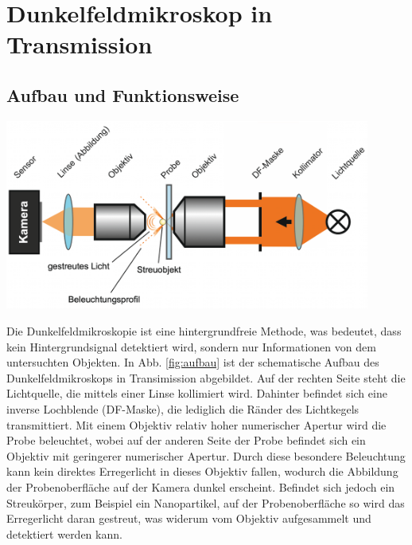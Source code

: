 
\section{Dunkelfeldmikroskop in Transmission}
\label{sec:mikroskop}

\subsection{Aufbau und Funktionsweise}
\label{sub:aufbau}

\begin{center}
    \captionsetup{type = figure}
    \includegraphics[width = 0.9\textwidth]{Bilder/Aufbau_Dunkelfeld.png}
    \label{fig:aufbau}
\end{center}

Die Dunkelfeldmikroskopie ist eine hintergrundfreie Methode, was bedeutet, dass kein Hintergrundsignal detektiert wird, sondern nur Informationen von dem untersuchten Objekten. In Abb. \ref{fig:aufbau} ist der schematische Aufbau des Dunkelfeldmikroskops in Transimission abgebildet. Auf der rechten Seite steht die Lichtquelle, die mittels einer Linse kollimiert wird. Dahinter beﬁndet sich eine inverse Lochblende (DF-Maske), die lediglich die Ränder des Lichtkegels transmittiert. Mit einem Objektiv relativ hoher numerischer Apertur wird die Probe beleuchtet, wobei auf der anderen Seite der Probe beﬁndet sich ein Objektiv mit geringerer numerischer Apertur. Durch diese besondere Beleuchtung kann kein direktes Erregerlicht in dieses Objektiv fallen, wodurch die Abbildung der Probenoberﬂäche auf der Kamera dunkel erscheint. Beﬁndet sich jedoch ein Streukörper, zum Beispiel ein Nanopartikel, auf der Probenoberﬂäche so wird das Erregerlicht daran gestreut, was widerum vom Objektiv aufgesammelt und detektiert werden kann. \cite{Anleitung}

